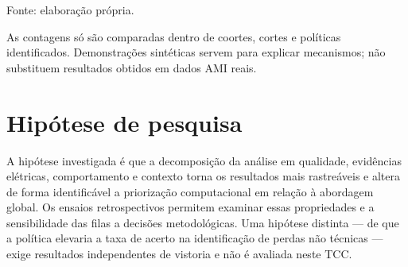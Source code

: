 {\small\noindent Fonte: elaboração própria.\par}


As contagens só são comparadas dentro de coortes, cortes e políticas identificados. Demonstrações sintéticas servem para explicar mecanismos; não substituem resultados obtidos em dados AMI reais.

\section{Hipótese de pesquisa}\label{hipuxf3tese-de-pesquisa}

A hipótese investigada é que a decomposição da análise em qualidade, evidências elétricas, comportamento e contexto torna os resultados mais rastreáveis e altera de forma identificável a priorização computacional em relação à abordagem global. Os ensaios retrospectivos permitem examinar essas propriedades e a sensibilidade das filas a decisões metodológicas. Uma hipótese distinta --- de que a política elevaria a taxa de acerto na identificação de perdas não técnicas --- exige resultados independentes de vistoria e não é avaliada neste TCC.




